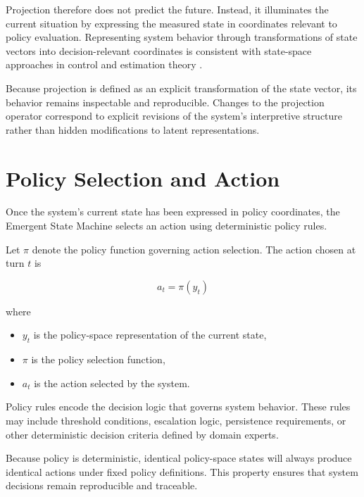 \documentclass[11pt]{article}
\begin{document}
Projection therefore does not predict the future. Instead, it illuminates the current situation by expressing the measured state in coordinates relevant to policy evaluation. Representing system behavior through transformations of state vectors into decision-relevant coordinates is consistent with state-space approaches in control and estimation theory \citep{kalman1960,ljung1999}.

Because projection is defined as an explicit transformation of the state vector, its behavior remains inspectable and reproducible. Changes to the projection operator correspond to explicit revisions of the system's interpretive structure rather than hidden modifications to latent representations.

\section{Policy Selection and Action}

Once the system's current state has been expressed in policy coordinates, the Emergent State Machine selects an action using deterministic policy rules.

Let $\pi$ denote the policy function governing action selection. The action chosen at turn $t$ is

\begin{equation}
a_t = \pi(y_t)
\end{equation}

where

\begin{itemize}
\item $y_t$ is the policy-space representation of the current state,
\item $\pi$ is the policy selection function,
\item $a_t$ is the action selected by the system.
\end{itemize}

Policy rules encode the decision logic that governs system behavior. These rules may include threshold conditions, escalation logic, persistence requirements, or other deterministic decision criteria defined by domain experts.

Because policy is deterministic, identical policy-space states will always produce identical actions under fixed policy definitions. This property ensures that system decisions remain reproducible and traceable.
\end{document}
